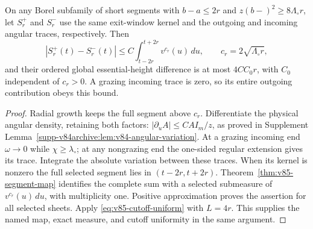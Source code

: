 \begin{corollary}
\label{cor:v85-audited-transfer}
On any Borel subfamily of short segments with $b-a\le2r$ and
$z(b-)^2\ge8\Lambda_\circ r$, let $S_r^+$ and $S_r^-$ use the
same exit-window kernel and the outgoing and incoming angular traces,
respectively. Then
\[
 |S_r^+(t)-S_r^-(t)|\le C\int_{t-2r}^{t+2r}v^{c_r}(u)\,du,
 \qquad c_r=2\sqrt{\Lambda_\circ r},
\]
and their ordered global essential-height difference is at most
$4CC_0r$, with $C_0$ independent of $c_r>0$. A grazing incoming
trace is zero, so its entire outgoing contribution obeys this bound.
\end{corollary}
\begin{proof}
Radial growth keeps the full segment above $c_r$. Differentiate the
physical angular density, retaining both factors:
$|\partial_u A|\le C A I_m/z$, as proved in Supplement
Lemma~\ref{supp-v84archive:lem:v84-angular-variation}. At a grazing
incoming end $\omega\to0$ while $\chi\ge\lambda_\circ$; at any
nongrazing end the one-sided regular extension gives its trace.
Integrate the absolute variation between these traces. When its kernel
is nonzero the full selected segment lies in $(t-2r,t+2r)$.
Theorem~\ref{thm:v85-segment-map} identifies the complete sum with a
selected submeasure of $v^{c_r}(u)\,du$, with multiplicity one.
Positive approximation proves the assertion for all selected sheets.
Apply \eqref{eq:v85-cutoff-uniform} with $L=4r$. This supplies the
named map, exact measure, and cutoff uniformity in the same argument.
\end{proof}
